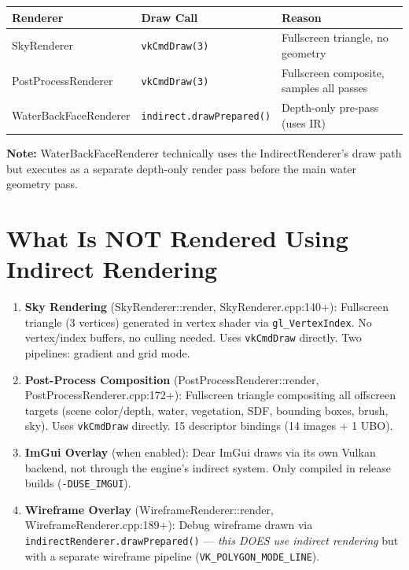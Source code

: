 \documentclass[11pt,a4paper]{article}
\begin{document}
\begin{longtable}{@{}lll@{}}
\toprule
\textbf{Renderer} & \textbf{Draw Call} & \textbf{Reason} \\
\midrule
SkyRenderer & \texttt{vkCmdDraw(3)} & Fullscreen triangle, no geometry \\
PostProcessRenderer & \texttt{vkCmdDraw(3)} & Fullscreen composite, samples all passes \\
WaterBackFaceRenderer & \texttt{indirect.drawPrepared()} & Depth-only pre-pass (uses IR) \\
\bottomrule
\end{longtable}

\textbf{Note:} WaterBackFaceRenderer technically uses the IndirectRenderer's draw path but executes as a separate depth-only render pass before the main water geometry pass.

\section{What Is NOT Rendered Using Indirect Rendering}

\begin{enumerate}
    \item \textbf{Sky Rendering} (SkyRenderer::render, SkyRenderer.cpp:140+): Fullscreen triangle (3 vertices) generated in vertex shader via \texttt{gl\_VertexIndex}. No vertex/index buffers, no culling needed. Uses \texttt{vkCmdDraw} directly. Two pipelines: gradient and grid mode.
    
    \item \textbf{Post-Process Composition} (PostProcessRenderer::render, PostProcessRenderer.cpp:172+): Fullscreen triangle compositing all offscreen targets (scene color/depth, water, vegetation, SDF, bounding boxes, brush, sky). Uses \texttt{vkCmdDraw} directly. 15 descriptor bindings (14 images + 1 UBO).
    
    \item \textbf{ImGui Overlay} (when enabled): Dear ImGui draws via its own Vulkan backend, not through the engine's indirect system. Only compiled in release builds (\texttt{-DUSE\_IMGUI}).
    
    \item \textbf{Wireframe Overlay} (WireframeRenderer::render, WireframeRenderer.cpp:189+): Debug wireframe drawn via \texttt{indirectRenderer.drawPrepared()} — \textit{this DOES use indirect rendering} but with a separate wireframe pipeline (\texttt{VK\_POLYGON\_MODE\_LINE}).
\end{enumerate}
\end{document}
